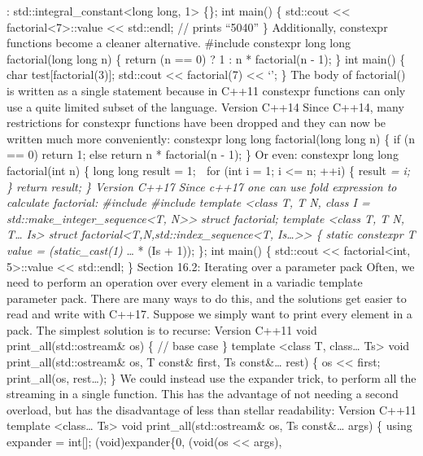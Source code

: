 : std::integral\_constant\textless long long, 1\textgreater{} \{\}; int
main() \{ std::cout \textless\textless{}
factorial\textless7\textgreater::value \textless\textless{} std::endl;
// prints ``5040'' \} Additionally, constexpr functions become a cleaner
alternative. \#include constexpr long long factorial(long long n) \{
return (n == 0) ? 1 : n * factorial(n - 1); \} int main() \{ char
test{[}factorial(3){]}; std::cout \textless\textless{} factorial(7)
\textless\textless{} `\n'; \} The body of factorial() is written as a
single statement because in C++11 constexpr functions can only use a
quite limited subset of the language. Version C++14 Since C++14, many
restrictions for constexpr functions have been dropped and they can now
be written much more conveniently: constexpr long long factorial(long
long n) \{ if (n == 0) return 1; else return n * factorial(n - 1); \} Or
even: constexpr long long factorial(int n) \{ long long result = 1; 
for (int i = 1; i \textless= n; ++i) \{ result \emph{= i; \} return
result; \} Version C++17 Since c++17 one can use fold expression to
calculate factorial: \#include \#include template \textless class T, T
N, class I = std::make\_integer\_sequence\textless T,
N\textgreater\textgreater{} struct factorial; template \textless class
T, T N, T\ldots{} Is\textgreater{} struct
factorial\textless T,N,std::index\_sequence\textless T,
Is\ldots\textgreater\textgreater{} \{ static constexpr T value =
(static\_cast(1) } \ldots{} * (Is + 1)); \}; int main() \{ std::cout
\textless\textless{} factorial\textless int, 5\textgreater::value
\textless\textless{} std::endl; \} Section 16.2: Iterating over a
parameter pack Often, we need to perform an operation over every element
in a variadic template parameter pack. There are many ways to do this,
and the solutions get easier to read and write with C++17. Suppose we
simply want to print every element in a pack. The simplest solution is
to recurse: Version C++11 void print\_all(std::ostream\& os) \{ // base
case \} template \textless class T, class\ldots{} Ts\textgreater{} void
print\_all(std::ostream\& os, T const\& first, Ts const\&\ldots{} rest)
\{ os \textless\textless{} first; print\_all(os, rest\ldots); \} We
could instead use the expander trick, to perform all the streaming in a
single function. This has the advantage of not needing a second
overload, but has the disadvantage of less than stellar readability:
Version C++11 template \textless class\ldots{} Ts\textgreater{} void
print\_all(std::ostream\& os, Ts const\&\ldots{} args) \{ using expander
= int{[}{]}; (void)expander\{0, (void(os \textless\textless{} args),
